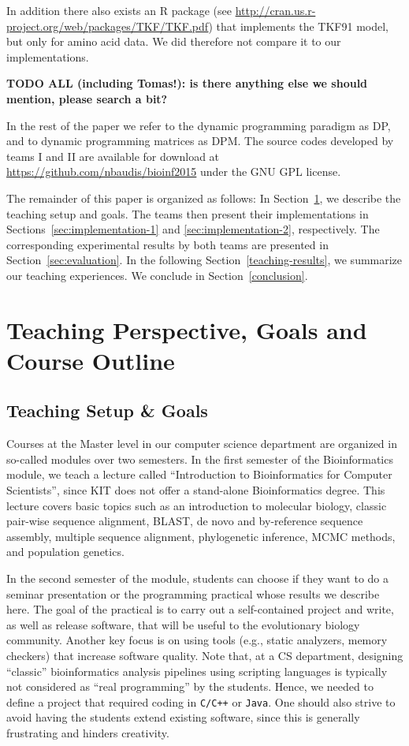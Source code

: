 \documentclass[runningheads,a4paper]{llncs}
\begin{document}
In addition there also exists an R package (see \url{http://cran.us.r-project.org/web/packages/TKF/TKF.pdf}) that implements the TKF91 model, but only for amino acid data. 
We did therefore not compare it to our implementations. 

{\bf TODO ALL (including Tomas!): is there anything else we should mention, please search a bit?}

In the rest of the paper we refer to the dynamic programming paradigm as DP, and to dynamic programming matrices as DPM.
The source codes developed by teams I and II are available for download at \url{https://github.com/nbaudis/bioinf2015} under the GNU GPL license.

The remainder of this paper is organized as follows: In Section~\ref{teaching}, we describe the teaching setup and goals. 
The teams then present their implementations in Sections~\ref{sec:implementation-1} and \ref{sec:implementation-2}, respectively. 
The corresponding experimental results by both teams are presented in Section~\ref{sec:evaluation}.
In the following Section~\ref{teaching-results}, we summarize our teaching experiences.
We conclude in Section~\ref{conclusion}.

\section{Teaching Perspective, Goals and Course Outline}
\label{teaching} 

\subsection{Teaching Setup \& Goals} 
\label{setup}

Courses at the Master level in our computer science department are organized in so-called modules over two semesters.
In the first semester of the Bioinformatics module, we teach a lecture called ``Introduction to Bioinformatics for Computer Scientists'', since KIT does not offer
a stand-alone Bioinformatics degree. This lecture covers basic topics such as an introduction to molecular biology, classic pair-wise sequence alignment,
BLAST, de novo and by-reference sequence assembly, multiple sequence alignment, phylogenetic inference, MCMC methods, and population genetics.

In the second semester of the module, students can choose if they want to do a seminar presentation or the programming practical whose results we describe here.
The goal of the practical is to carry out a self-contained project and write, as well as release software, that will be useful to the evolutionary biology community.
Another key focus is on using tools (e.g., static analyzers, memory checkers) that increase software quality.
Note that, at a CS department, designing ``classic'' bioinformatics analysis pipelines using scripting languages is typically not considered as ``real programming'' by the
students. Hence, we needed to define a project that required coding in \texttt{C/C++} or \texttt{Java}.
One should also strive to avoid having the students extend existing software, since
this is generally frustrating and hinders creativity.
\end{document}
